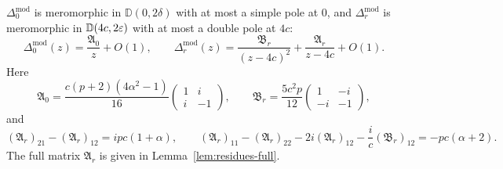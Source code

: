 \begin{lemma}\label{lem:laurent}
$\Delta_0^{\mathrm{mod}}$ is meromorphic in $\mathbb D(0,2\delta)$ with at most a simple pole at $0$, and $\Delta_r^{\mathrm{mod}}$ is
meromorphic in $\mathbb D(4c,2\varepsilon)$ with at most a double pole at $4c$:
\[
  \Delta_0^{\mathrm{mod}}(z)=\frac{\mathfrak A_0}z+O(1),\qquad
  \Delta_r^{\mathrm{mod}}(z)=\frac{\mathfrak B_r}{(z-4c)^2}+\frac{\mathfrak A_r}{z-4c}+O(1).
\]
Here
\[
  \mathfrak A_0=\frac{c(p+2)(4\alpha^2-1)}{16}\begin{pmatrix}1&i\\i&-1\end{pmatrix},\qquad
  \mathfrak B_r=\frac{5c^2p}{12}\begin{pmatrix}1&-i\\-i&-1\end{pmatrix},
\]
and
\begin{equation}\label{eq:Ar-combinations}
  (\mathfrak A_r)_{21}-(\mathfrak A_r)_{12}=ipc(1+\alpha),\qquad
  (\mathfrak A_r)_{11}-(\mathfrak A_r)_{22}-2i(\mathfrak A_r)_{12}-\frac ic(\mathfrak B_r)_{12}=-pc(\alpha+2).
\end{equation}
The full matrix $\mathfrak A_r$ is given in Lemma~\ref{lem:residues-full}.
\end{lemma}


